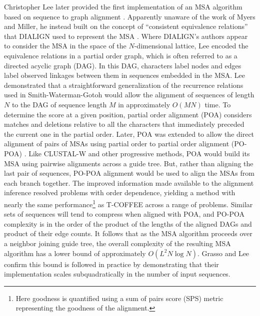 Christopher Lee later provided the first implementation of an MSA algorithm based on sequence to graph alignment \cite{lee2002POA}.
Apparently unaware of the work of Myers and Miller, he instead built on the concept of ``consistent equivalence relations'' that DIALIGN used to represent the MSA \cite{morgenstern1996multiple}.
Where DIALIGN's authors appear to consider the MSA in the space of the $N$-dimensional lattice, Lee encoded the equivalence relations in a partial order graph, which is often referred to as a directed acyclic graph (DAG).
In this DAG, characters label nodes and edges label observed linkages between them in sequences embedded in the MSA.
Lee demonstrated that a straightforward generalization of the recurrence relations used in Smith-Waterman-Gotoh would allow the alignment of sequences of length $N$ to the DAG of sequence length $M$ in approximately $O(MN)$ time.
To determine the score at a given position, partial order alignment (POA) considers matches and deletions relative to all the characters that immediately preceded the current one in the partial order.
Later, POA was extended to allow the direct alignment of pairs of MSAs using partial order to partial order alignment (PO-POA) \cite{grasso2004combining}.
Like CLUSTAL-W and other progressive methods, POA would build its MSA using pairwise alignments across a guide tree.
But, rather than aligning the last pair of sequences, PO-POA alignment would be used to align the MSAs from each branch together.
The improved information made available to the alignment inference resolved problems with order dependence, yielding a method with nearly the same performance\footnote{Here goodness is quantified using a sum of pairs score (SPS) metric representing the goodness of the alignment.} as T-COFFEE across a range of problems.
Similar sets of sequences will tend to compress when aligned with POA, and PO-POA complexity is in the order of the product of the lengths of the aligned DAGs and product of their edge counts.
It follows that as the MSA algorithm proceeds over a neighbor joining guide tree, the overall complexity of the resulting MSA algorithm has a lower bound of approximately $O(L^{2}N\log{N})$.
Grasso and Lee confirm this bound is followed in practice by demonstrating that their implementation scales subquadratically in the number of input sequences.

